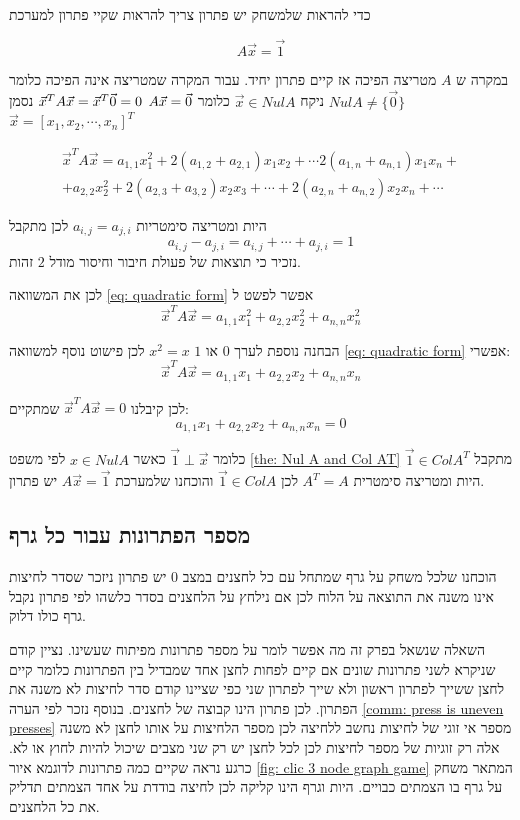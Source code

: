 \documentclass[12pt,leqno]{article}
\begin{document}
כדי להראות שלמשחק יש פתרון 
צריך להראות שקיי פתרון למערכת

\[A \vec{x} = \vec{1} \]

במקרה ש 
$A$
מטריצה הפיכה אז קיים פתרון יחיד.
עבור המקרה שמטריצה אינה הפיכה 
כלומר 
$Nul A \neq \{ \vec{0}\}$
ניקח 
$\vec{x} \in Nul A$
כלומר 
$A\vec{x} = \vec{0} \\$
$\vec{x}^T A \vec{x} = \vec{x}^T\vec{0} = 0 \\$
נסמן 
$\vec{x} = [x_1, x_2, \cdots, x_n]^T$

\begin{multline}
    \label{eq: quadratic form}
        \vec{x}^T A \vec{x} = a_{1,1}x_1^2 + 2(a_{1,2} + a_{2,1})x_1x_2 + \cdots 2(a_{1,n} + a_{n,1})x_1x_n + \\
        + a_{2,2}x_2^2 +  2(a_{2,3} + a_{3,2})x_2x_3 + \cdots  + 2(a_{2,n} + a_{n,2})x_2x_n + \cdots
\end{multline}

היות ומטריצה סימטריות
$a_{i,j} = a_{j,i}$
לכן
מתקבל
\[a_{i,j} - a_{j,i} = a_{i,j} + \cdots + a_{j,i} = 1 \]
נזכיר כי תוצאות של פעולת חיבור וחיסור מודל 
$2$
זהות.

לכן
את המשוואה 
\ref{eq: quadratic form}
אפשר לפשט ל
\[ \vec{x}^T A \vec{x} = a_{1,1}x_1^2 + a_{2,2} x_2^2 +  a_{n,n} x_n^2\]

הבחנה נוספת לערך 
$0$
או
$1$
$x^2 = x$
לכן פישוט נוסף למשוואה 
\ref{eq: quadratic form}
אפשרי:
\[ \vec{x}^T A \vec{x} = a_{1,1}x_1 + a_{2,2} x_2 +  a_{n,n} x_n\]

לכן קיבלנו 
$ \vec{x}^T A \vec{x} = 0$
שמתקיים:
\[a_{1,1}x_1 + a_{2,2} x_2 +  a_{n,n} x_n = 0\]

כלומר 
$\vec{1} \perp  \vec{x}$
כאשר 
$x \in Nul A$
לפי משפט 
\ref{the: Nul A and Col AT}
מתקבל 
$\vec{1} \in Col A^T$
היות ומטריצה סימטרית 
$A^T = A$
לכן
$\vec{1} \in Col A$
והוכחנו שלמערכת
$A\vec{x} = \vec{1}$
יש פתרון.

\subsection{מספר הפתרונות עבור כל גרף}
הוכחנו שלכל משחק על גרף שמתחל עם כל לחצנים במצב 
$0$
יש פתרון ניזכר שסדר לחיצות
אינו משנה את התוצאה על הלוח לכן אם נילחץ על הלחצנים בסדר כלשהו 
לפי פתרון נקבל גרף כולו דלוק.

השאלה  שנשאל בפרק זה מה אפשר לומר על מספר פתרונות מפיתוח שעשינו.
נציין קודם שניקרא לשני פתרונות שונים אם קיים לפחות לחצן אחד שמבדיל בין הפתרונות 
כלומר קיים לחצן ששייך לפתרון ראשון ולא שייך לפתרון שני כפי שציינו קודם סדר
לחיצות לא משנה את הפתרון.
לכן פתרון הינו קבוצה של לחצנים.
בנוסף נזכר לפי הערה
\ref{comm: press is uneven presses}
מספר אי זוגי של לחיצות נחשב ללחיצה לכן מספר הלחיצות על אותו לחצן לא משנה 
אלה רק זוגיות של מספר לחיצות 
לכן לכל לחצן יש רק שני מצבים שיכול להיות 
לחוץ 
או לא.
כרגע נראה שקיים כמה פתרונות לדוגמא 
איור
\ref{fig: clic 3 node graph game}
המתאר משחק על גרף בו הצמתים כבויים.
היות וגרף הינו קליקה לכן לחיצה בודדת על אחד הצמתים תדליק את כל הלחצנים.
\end{document}
